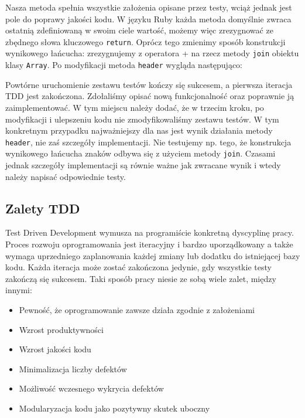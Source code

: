     Nasza metoda spełnia wszystkie założenia opisane przez testy, wciąż jednak jest pole do poprawy jakości kodu. W języku Ruby każda metoda domyślnie zwraca ostatnią zdefiniowaną w swoim ciele wartość, możemy więc zrezygnować ze zbędnego słowa kluczowego \verb+return+. Oprócz tego zmienimy sposób konstrukcji wynikowego łańcucha: zrezygnujemy z operatora \verb+++ na rzecz metody \verb+join+ obiektu klasy \verb+Array+. Po modyfikacji metoda \verb+header+ wygląda następująco:
    
    
    
  Powtórne uruchomienie zestawu testów kończy się sukcesem, a pierwsza iteracja TDD jest zakończona. Zdołaliśmy opisać nową funkcjonalność oraz poprawnie ją zaimplementować. W tym miejscu należy dodać, że w trzecim kroku, po modyfikacji i ulepszeniu kodu nie zmodyfikowaliśmy zestawu testów. W tym konkretnym przypadku najważniejszy dla nas jest wynik działania metody \verb+header+, nie zaś szczegóły implementacji. Nie testujemy np. tego, że konstrukcja wynikowego łańcucha znaków odbywa się z użyciem metody \verb+join+. Czasami jednak szczegóły implementacji są równie ważne jak zwracane wynik i wtedy należy napisać odpowiednie testy.
    
  \subsection{Zalety TDD}
    Test Driven Development wymusza na programiście konkretną dyscyplinę pracy. Proces rozwoju oprogramowania jest iteracyjny i bardzo uporządkowany a także wymaga uprzedniego zaplanowania każdej zmiany lub dodatku do istniejącej bazy kodu. Każda iteracja może zostać zakończona jedynie, gdy wszystkie testy zakończą się sukcesem. Taki sposób pracy niesie ze sobą wiele zalet, między innymi:
     
    \begin{itemize}
      \item Pewność, że oprogramowanie zawsze działa zgodnie z założeniami
      \item Wzrost produktywności
      \item Wzrost jakości kodu
      \item Minimalizacja liczby defektów
      \item Możliwość wczesnego wykrycia defektów
      \item Modularyzacja kodu jako pozytywny skutek uboczny
    \end{itemize}


